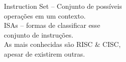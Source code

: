 \documentclass[preview]{standalone}
\begin{document}
Instruction Set -- Conjunto de possíveis\\ operações em um contexto.\\ISAs -- formas de classificar esse\\ conjunto de instruções.\\As mais conhecidas são RISC \& CISC,\\ apesar de existirem outras.\\
\end{document}
